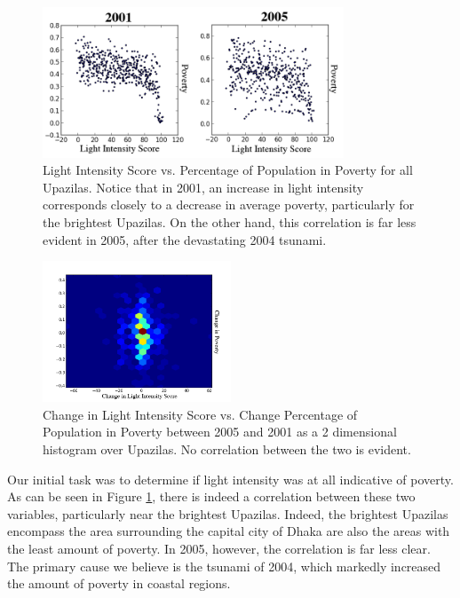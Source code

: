\documentclass[10pt, letterpaper]{article}
\theoremstyle{plain}
\theoremstyle{definition}
\begin{document}
\begin{figure}
  \centering
  \includegraphics[width=0.8\textwidth]{figures/light-vs-poverty}
  \caption{Light Intensity Score vs. Percentage of Population in Poverty for all Upazilas.  Notice that in 2001, an increase in light intensity corresponds closely to a decrease in average poverty, particularly for the brightest Upazilas. On the other hand,  this correlation is far less evident in 2005, after the devastating 2004 tsunami.}
  \label{fig:light-vs-poverty}
\end{figure}

\begin{figure}
  \centering
  \includegraphics[width=0.5\textwidth]{figures/dlight-vs-dpoverty}
  \caption{Change in Light Intensity Score vs. Change Percentage of Population in Poverty between 2005 and 2001 as a 2 dimensional histogram over Upazilas. No correlation between the two is evident.}
  \label{fig:dlight-vs-dpoverty}
\end{figure}

  Our initial task was to determine if light intensity was at all indicative of poverty. As can be seen in Figure \ref{fig:light-vs-poverty}, there is indeed a correlation between these two variables, particularly near the brightest Upazilas. Indeed, the brightest Upazilas encompass the area surrounding the capital city of Dhaka are also the areas with the least amount of poverty.  In 2005, however, the correlation is far less clear.  The primary cause we believe is the tsunami of 2004, which markedly increased the amount of poverty in coastal regions.  
  
\end{document}
